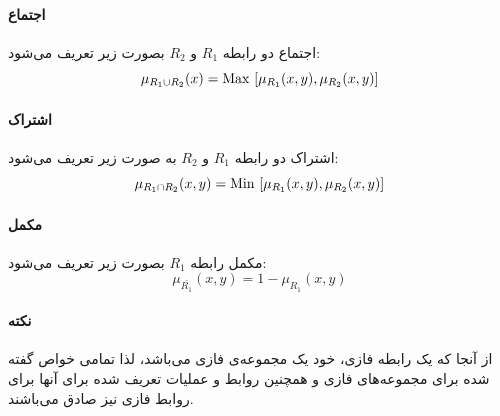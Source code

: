 \paragraph{اجتماع}
اجتماع دو رابطه $R_1$ و $R_2$  بصورت زیر تعریف می‌شود:
\begin{equation}\label{eq:e_frel_op_union}
\mu_{R_1 \cup R_2}(x) = {\rm Max}\ [\mu_{R_1}(x,y), \mu_{R_2}(x,y)]
\end{equation}
\paragraph{ اشتراک}
اشتراک دو رابطه $R_1$ و $R_2$ به صورت زیر تعریف می‌شود:
\begin{equation}\label{eq:e_frel_op_intersect}
\mu_{R_1 \cap R_2}(x,y) = {\rm Min}\ [\mu_{R_1}(x,y), \mu_{R_2}(x,y)]
\end{equation}
\paragraph{ مکمل}
مکمل رابطه $R_1$ بصورت زیر تعریف می‌شود:
\begin{equation}\label{eq:e_frel_op_complement}
\mu_{\bar{R_1}}(x,y) = 1- \mu_{R_1}(x,y)
\end{equation}
\paragraph{نکته}
از آنجا که یک رابطه فازی، خود یک مجموعه‌ی فازی می‌باشد، لذا تمامی خواص گفته شده برای مجموعه‌های فازی و همچنین روابط و عملیات تعریف شده برای آنها برای روابط فازی نیز صادق می‌باشند. 